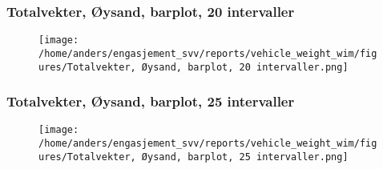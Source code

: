 \documentclass{article}
\begin{document}
\subsubsection{Totalvekter, Øysand, barplot, 20 intervaller}
\begin{figure}[H]
\centering
\texttt{[image: /home/anders/engasjement\_svv/reports/vehicle\_weight\_wim/figures/Totalvekter, Øysand, barplot, 20 intervaller.png]}
\end{figure}
\subsubsection{Totalvekter, Øysand, barplot, 25 intervaller}
\begin{figure}[H]
\centering
\texttt{[image: /home/anders/engasjement\_svv/reports/vehicle\_weight\_wim/figures/Totalvekter, Øysand, barplot, 25 intervaller.png]}
\end{figure}
\end{document}
